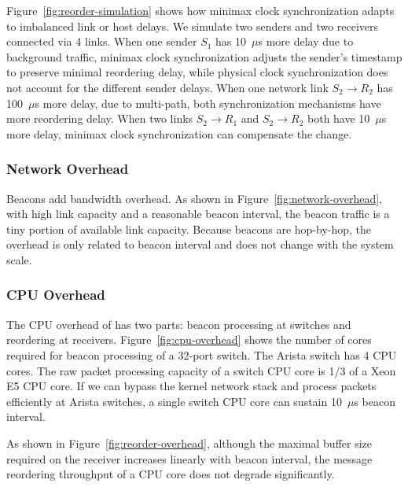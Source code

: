 Figure~\ref{fig:reorder-simulation} shows how minimax clock synchronization adapts to imbalanced link or host delays. We simulate two senders and two receivers connected via 4 links. When one sender $S_1$ has 10~$\mu$s more delay due to background traffic, minimax clock synchronization adjusts the sender's timestamp to preserve minimal reordering delay, while physical clock synchronization does not account for the different sender delays. When one network link $S_2 \rightarrow R_2$ has 100~$\mu$s more delay, due to multi-path, both synchronization mechanisms have more reordering delay. When two links $S_2 \rightarrow R_1$ and $S_2 \rightarrow R_2$ both have 10~$\mu$s more delay, minimax clock synchronization can compensate the change.





\subsubsection{Network Overhead}
\label{sec:eval-overhead}

Beacons add bandwidth overhead. As shown in Figure~\ref{fig:network-overhead}, with high link capacity and a reasonable beacon interval, the beacon traffic is a tiny portion of available link capacity. Because beacons are hop-by-hop, the overhead is only related to beacon interval and does not change with the system scale.

\subsubsection{CPU Overhead}
\label{sec:eval-cpu-overhead}

The CPU overhead of \sys has two parts: beacon processing at switches and reordering at receivers.
Figure~\ref{fig:cpu-overhead} shows the number of cores required for beacon processing of a 32-port switch. The Arista switch has 4 CPU cores. The raw packet processing capacity of a switch CPU core is 1/3 of a Xeon E5 CPU core. If we can bypass the kernel network stack and process packets efficiently at Arista switches, a single switch CPU core can sustain 10~$\mu$s beacon interval.

As shown in Figure~\ref{fig:reorder-overhead}, although the maximal buffer size required on the receiver increases linearly with beacon interval, the message reordering throughput of a CPU core does not degrade significantly.

